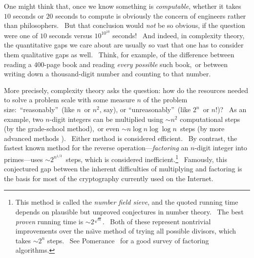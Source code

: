 \documentclass[12pt,onecolumn]{article}%
\begin{document}
One might think that, once we know something is \textit{computable}, whether
it takes $10$ seconds or $20$ seconds to compute is obviously the concern of
engineers rather than philosophers. \ But that conclusion would \textit{not}
be so obvious, if the question were one of $10$ seconds versus $10^{10^{10}}$
seconds! \ And indeed, in complexity theory, the quantitative gaps we care
about are usually so vast that one has to consider them qualitative gaps as
well. \ Think, for example, of the difference between reading a $400$-page
book and reading \textit{every possible} such book,\ or between writing down a
thousand-digit number and counting to that number.

More precisely, complexity theory asks the question: how do the resources
needed to solve a problem scale with some measure $n$ of the problem
size:\ \textquotedblleft reasonably\textquotedblright\ (like $n$\ or $n^{2}$,
say), or \textquotedblleft unreasonably\textquotedblright\ (like $2^{n}$\ or
$n!$)? \ As an example, two $n$-digit integers can be multiplied using $\sim
n^{2}$ computational steps (by the grade-school method),\ or even $\sim n\log
n\log\log n$\ steps (by more advanced methods \cite{schonhagestrassen}).
\ Either method is considered efficient. \ By contrast, the fastest known
method for the reverse operation---\textit{factoring} an $n$-digit integer
into primes---uses $\sim2^{n^{1/3}}$\ steps, which is considered
inefficient.\footnote{This method is called the \textit{number field sieve},
and the quoted running time depends on plausible but unproved conjectures in
number theory. \ The best \textit{proven} running time is $\sim2^{\sqrt{n}}$.
\ Both of these represent nontrivial improvements over the na\"{\i}ve method
of trying all possible divisors, which takes $\sim2^{n}$ steps. \ See
Pomerance \cite{pomerance}\ for a good survey of factoring algorithms.}
\ Famously, this conjectured gap between the inherent difficulties of
multiplying and factoring is the basis for most of the cryptography currently
used on the Internet.
\end{document}
